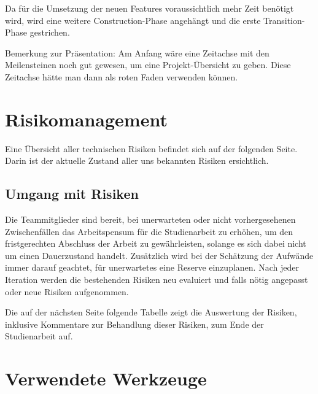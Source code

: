 \documentclass[12pt, a4paper]{report}
\begin{document}
	Da für die Umsetzung der neuen Features voraussichtlich mehr Zeit benötigt wird, wird eine weitere Construction-Phase angehängt und die erste Transition-Phase gestrichen.
	
	Bemerkung zur Präsentation:
	Am Anfang wäre eine Zeitachse mit den Meilensteinen noch gut gewesen, um eine Projekt-Übersicht zu geben. Diese Zeitachse hätte man dann als roten Faden verwenden können.
	
	
	
	\chapter{Risikomanagement}
	Eine Übersicht aller technischen Risiken befindet sich auf der folgenden Seite. Darin ist der aktuelle Zustand aller uns bekannten Risiken ersichtlich.
	
	\section{Umgang mit Risiken}
	Die Teammitglieder sind bereit, bei unerwarteten oder nicht vorhergesehenen Zwischenfällen das Arbeitspensum für die Studienarbeit zu erhöhen, um den fristgerechten Abschluss der Arbeit zu gewährleisten, solange es sich dabei nicht um einen Dauerzustand handelt. Zusätzlich wird bei der Schätzung der Aufwände immer darauf geachtet, für unerwartetes eine Reserve einzuplanen.
	Nach jeder Iteration werden die bestehenden Risiken neu evaluiert und falls nötig angepasst oder neue Risiken aufgenommen.
	
	Die auf der nächsten Seite folgende Tabelle zeigt die Auswertung der Risiken, inklusive Kommentare zur Behandlung dieser Risiken, zum Ende der Studienarbeit auf.
	
	 

	\chapter{Verwendete Werkzeuge}
	\label{chap:werkzeuge}
	
	
	
\end{document}
